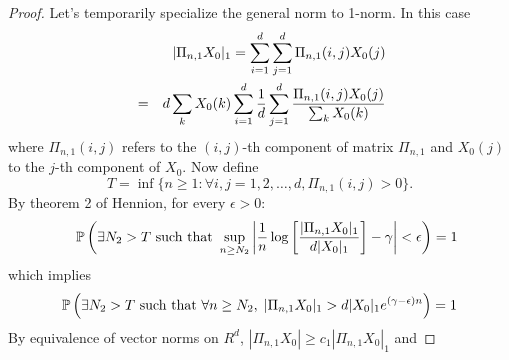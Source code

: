 \begin{proof}
  Let's temporarily specialize the general norm to
  1-norm. In this case
  \begin{eqnarray*}
    &&
    |\Pi_{n, 1} X_0|_1 = \sum_{i=1}^d \sum_{j=1}^d \Pi_{n, 1}(i, j)
    X_0(j) \\
    &=&
    d \sum_{k} X_0(k)
    \sum_{i=1}^d {1 \over d}
    \sum_{j=1}^d
    {
      \Pi_{n, 1}(i, j) X_0(j)
      \over
      \sum_{k} X_0(k)      
    }
  \end{eqnarray*}
  where $\Pi_{n, 1}(i, j)$ refers to the $(i, j)$-th component of
  matrix $\Pi_{n, 1}$ and $X_0(j)$ to the $j$-th component of $X_0$.
  Now define
  \[
  T = \inf\{n \geq 1: \forall i, j = 1,2,\ldots,d, \Pi_{n, 1}(i, j) > 0\}.
  \]
  By theorem 2 of Hennion\footnotemark \cite{hennion:1997}, for every
  $\epsilon > 0$:
  \begin{eqnarray*}
    &&
    \P \left(
    \exists N_2 > T \text{ such that }
      \sup_{n \geq N_2}
      \left|
        {1 \over n} \log \left[
          {|\Pi_{n, 1} X_0|_1 \over d |X_0|_1}
        \right]
        - \gamma
        \right|
        < \epsilon
    \right) = 1
  \end{eqnarray*}
  which implies
  \[
    \P \left(
    \exists N_2 > T \text{ such that }
      \forall n \geq N_2,\;
      |\Pi_{n, 1} X_0|_1 > d |X_0|_1 e^{(\gamma - \epsilon) n}
    \right) = 1
  \]
  By equivalence of vector norms on $R^d$,
  $|\Pi_{n, 1} X_0| \geq c_1 | \Pi_{n, 1} X_0|_1$ and

\end{proof}
